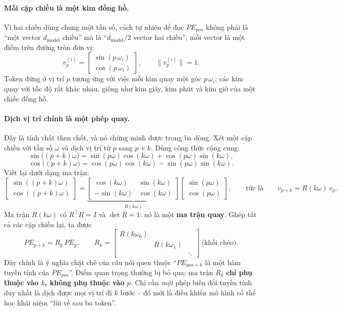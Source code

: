 \paragraph{Mỗi cặp chiều là một kim đồng hồ.} Vì hai chiều dùng chung một tần số, cách tự nhiên để đọc $PE_{pos}$ không phải là “một vector $d_{\text{model}}$ chiều” mà là “$d_{\text{model}}/2$ vector hai chiều”, mỗi vector là một điểm trên đường tròn đơn vị:
\[
v_p^{(i)} = \begin{bmatrix} \sin(p\,\omega_i) \\ \cos(p\,\omega_i) \end{bmatrix}, \qquad \|v_p^{(i)}\| = 1 .
\]
Token đứng ở vị trí $p$ tương ứng với việc mỗi kim quay một góc $p\,\omega_i$; các kim quay với tốc độ rất khác nhau, giống như kim giây, kim phút và kim giờ của một chiếc đồng hồ.

\paragraph{Dịch vị trí chính là một phép quay.} Đây là tính chất then chốt, và nó chứng minh được trong ba dòng. Xét một cặp chiều với tần số $\omega$ và dịch vị trí từ $p$ sang $p+k$. Dùng công thức cộng cung:
\[
\sin\big((p+k)\omega\big) = \sin(p\omega)\cos(k\omega) + \cos(p\omega)\sin(k\omega),
\]
\[
\cos\big((p+k)\omega\big) = \cos(p\omega)\cos(k\omega) - \sin(p\omega)\sin(k\omega).
\]
Viết lại dưới dạng ma trận:
\[
\begin{bmatrix} \sin((p+k)\omega) \\ \cos((p+k)\omega) \end{bmatrix}
=
\underbrace{\begin{bmatrix} \cos(k\omega) & \sin(k\omega) \\ -\sin(k\omega) & \cos(k\omega) \end{bmatrix}}_{R(k\omega)}
\begin{bmatrix} \sin(p\omega) \\ \cos(p\omega) \end{bmatrix},
\qquad \text{tức là} \qquad
v_{p+k} = R(k\omega)\, v_p .
\]
Ma trận $R(k\omega)$ có $R^\top R = I$ và $\det R = 1$: nó là một \textbf{ma trận quay}. Ghép tất cả các cặp chiều lại, ta được
\[
PE_{p+k} = R_k \, PE_p, \qquad
R_k = \begin{bmatrix} R(k\omega_0) & & \\ & R(k\omega_1) & \\ & & \ddots \end{bmatrix} \ \text{(khối chéo)} .
\]
Đây chính là ý nghĩa chặt chẽ của câu nói quen thuộc “$PE_{pos+k}$ là một hàm tuyến tính của $PE_{pos}$”. Điểm quan trọng thường bị bỏ qua: ma trận $R_k$ \textbf{chỉ phụ thuộc vào $k$, không phụ thuộc vào $p$}. Chỉ cần \emph{một} phép biến đổi tuyến tính duy nhất là dịch được mọi vị trí đi $k$ bước -- đó mới là điều khiến mô hình có thể học khái niệm “lùi về sau ba token”.

